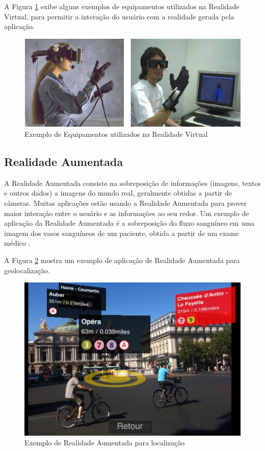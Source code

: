 A Figura \ref{fig:equipamentos_rv} exibe alguns exemplos de equipamentos utilizados na Realidade
Virtual, para permitir a interação do usuário com a realidade gerada pela aplicação.

\begin{figure}[h!]
    \centering
    \caption{Exemplo de Equipamentos utilizados na Realidade Virtual}
    \label{fig:equipamentos_rv}
    \includegraphics[width=14cm]{resources/equipamentos-rv.png}
\end{figure}



\subsection{Realidade Aumentada}


A Realidade Aumentada consiste na sobreposição de informações (imagens, textos e outros dados) a imagens
do mundo real, geralmente obtidas a partir de câmeras. Muitas aplicações estão usando a Realidade Aumentada
para prover maior interação entre o usuário e as informações ao seu redor. Um exemplo de aplicação da 
Realidade Aumentada é a sobreposição do fluxo sanguíneo em uma imagem dos vasos sanguíneos de um paciente,
obtida a partir de um exame médico \cite{ARColaborativa}.

A Figura \ref{fig:AR-map-locations11} mostra um exemplo de aplicação de Realidade Aumentada para geolocalização.

\begin{figure}[h!]
    \centering
    \caption{Exemplo de Realidade Aumentada para localização}
    \label{fig:AR-map-locations11}
    \includegraphics[width=15cm]{resources/augmented-reality-paris.jpg}
\end{figure}



